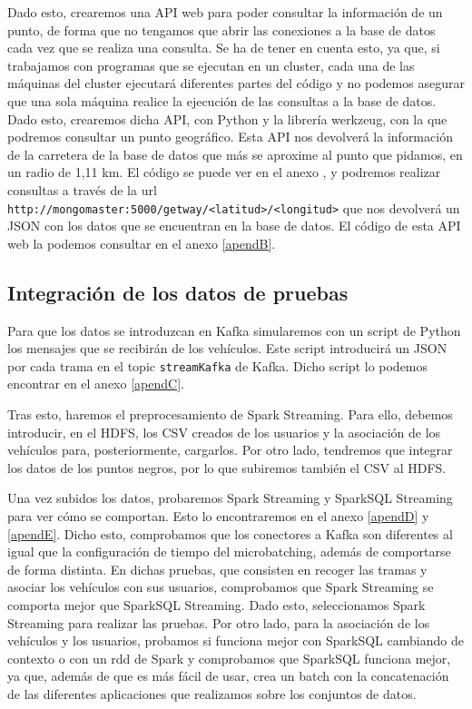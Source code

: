 Dado esto, crearemos una API web para poder consultar la información de un
punto, de forma que no tengamos que abrir las conexiones a la base de datos
cada vez que se realiza una consulta. Se ha de tener en cuenta esto, ya
que, si trabajamos con programas que se ejecutan en un cluster, cada una de
las máquinas del cluster ejecutará diferentes partes del código y no
podemos asegurar que una sola máquina realice la ejecución de las consultas
a la base de datos. Dado esto, crearemos dicha API, con Python y la
librería werkzeug, con la que podremos consultar un punto geográfico. Esta
API nos devolverá la información de la carretera de la base de datos que
más se aproxime al punto que pidamos, en un radio de 1,11 km. El código se
puede ver en el anexo %
, y podremos realizar consultas a través de la url {\tt
  http://mongomaster:5000/getway/<latitud>/<longitud>} que nos devolverá un
JSON con los datos que se encuentran en la base de datos. El código de esta
API web la podemos consultar en el anexo \ref{apendB}.

\subsection {Integración de los datos de pruebas \label{integracion}}

Para que los datos se introduzcan en Kafka simularemos con un script de
Python los mensajes que se recibirán de los vehículos. Este script
introducirá un JSON por cada trama en el topic {\tt streamKafka} de Kafka.
Dicho script lo podemos encontrar en el anexo \ref{apendC}.

Tras esto, haremos el preprocesamiento de Spark Streaming. Para ello, debemos introducir, en el HDFS, los CSV creados de los usuarios y la asociación de los vehículos para, posteriormente, cargarlos. Por otro lado, tendremos que integrar los datos de los puntos negros, por lo que subiremos también el CSV al HDFS.

Una vez subidos los datos, probaremos Spark Streaming y SparkSQL Streaming para ver cómo se comportan. Esto lo encontraremos en el anexo \ref{apendD} y \ref{apendE}. Dicho esto, comprobamos que los conectores a Kafka son diferentes al igual que la configuración de tiempo del microbatching, además de comportarse de forma distinta. En dichas pruebas, que consisten en recoger las tramas y asociar los vehículos con sus usuarios, comprobamos que Spark Streaming se comporta mejor que SparkSQL Streaming. Dado esto, seleccionamos Spark Streaming para realizar las pruebas. Por otro lado, para la asociación de los vehículos y los usuarios, probamos si funciona mejor con SparkSQL cambiando de contexto o con un rdd de Spark y comprobamos que SparkSQL funciona mejor, ya que, además de que es más fácil de usar, crea un batch con la concatenación de las diferentes aplicaciones que realizamos sobre los conjuntos de datos.

